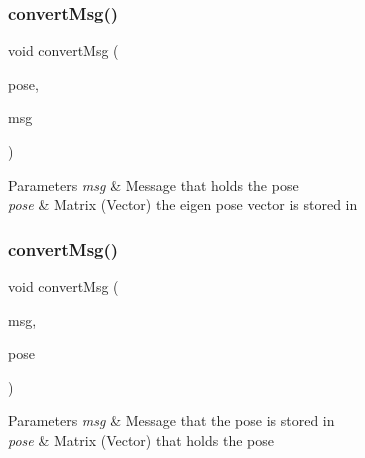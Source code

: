 \subsubsection{\texorpdfstring{convert\+Msg()}{convertMsg()}\hspace{0.1cm}{\footnotesize\ttfamily [7/14]}}
{\footnotesize\ttfamily void convert\+Msg (\begin{DoxyParamCaption}\item[{Eigen\+::\+Matrix$<$ double, 7, 1 $>$ \&}]{pose,  }\item[{geometry\+\_\+msgs\+::\+Pose\+Stamped \&}]{msg }\end{DoxyParamCaption})\hspace{0.3cm}{\ttfamily [inline]}}


\begin{DoxyParams}{Parameters}
{\em msg} & Message that holds the pose \\
\hline
{\em pose} & Matrix (Vector) the eigen pose vector is stored in \\
\hline
\end{DoxyParams}
\mbox{\label{group__MultiRobotController_ga7beb50c98e49263d05b3b819be58d76c}} 
\subsubsection{\texorpdfstring{convert\+Msg()}{convertMsg()}\hspace{0.1cm}{\footnotesize\ttfamily [8/14]}}
{\footnotesize\ttfamily void convert\+Msg (\begin{DoxyParamCaption}\item[{geometry\+\_\+msgs\+::\+Pose \&}]{msg,  }\item[{Eigen\+::\+Matrix$<$ double, 7, 1 $>$ \&}]{pose }\end{DoxyParamCaption})\hspace{0.3cm}{\ttfamily [inline]}}


\begin{DoxyParams}{Parameters}
{\em msg} & Message that the pose is stored in \\
\hline
{\em pose} & Matrix (Vector) that holds the pose \\
\hline
\end{DoxyParams}
\mbox{\label{group__MultiRobotController_gaf1628de186f2d90b064f8c8b36beef53}} 
